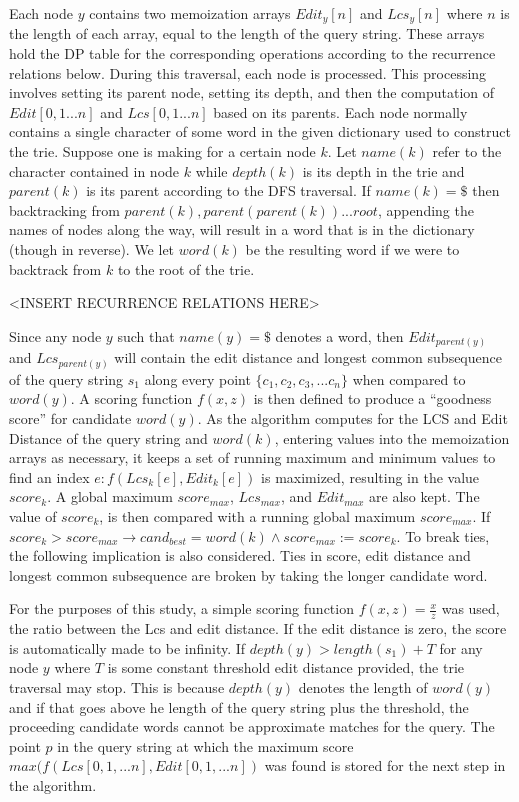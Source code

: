 \documentclass{acm_proc_article-sp}
\begin{document}
Each node $y$ contains two memoization arrays $Edit_{y}[n]$ and $Lcs_{y}[n]$ where $n$ is the length of each array, equal to the length of the query string. These arrays hold the DP table for the corresponding operations according to the recurrence relations below. During this traversal, each node is processed. This processing involves setting its parent node, setting its depth, and then the computation of $Edit[0,1. . . n]$ and $Lcs[0,1. . . n]$ based on its parents. Each node normally contains a single character of some word in the given dictionary used to construct the trie. Suppose one is making for a certain node $k$. Let $name(k)$ refer to the character contained in node $k$ while $depth(k)$ is its depth in the trie and $parent(k)$ is its parent according to the DFS traversal. If $name(k) = \$$ then backtracking from $parent(k), parent(parent(k)) . . . root$, appending the names of nodes along the way, will result in a word that is in the dictionary (though in reverse). We let $word(k)$ be the resulting word if we were to backtrack from $k$ to the root of the trie. 

<INSERT RECURRENCE RELATIONS HERE> 

Since any node $y$ such that $name(y) = \$$ denotes a word, then $Edit_{parent(y)}$ and $Lcs_{parent(y)}$ will contain the edit distance and longest common subsequence of the query string $s_1$ along every point $\{c_1,c_2,c_3, . . . c_n\}$ when compared to $word(y)$. A scoring function $f(x,z)$ is then defined to produce a ``goodness score'' for candidate $word(y)$. As the algorithm computes for the LCS and Edit Distance of the query string and $word(k)$, entering values into the memoization arrays as necessary, it keeps a set of running maximum and minimum values to find an index $e:f(Lcs_k[e],Edit_k[e])$ is maximized, resulting in the value $score_k$. A global maximum $score_{max}$, $Lcs_{max}$, and $Edit_{max}$ are also kept. The value of $score_k$, is then compared with a running global maximum $score_{max}$. If $score_k > score_{max} \rightarrow cand_{best} = word(k) \wedge score_{max} := score_k$. To break ties, the following implication is also considered. Ties in score, edit distance and longest common subsequence are broken by taking the longer candidate word. 

For the purposes of this study, a simple scoring function $f(x,z) = \frac{x}{z}$ was used, the ratio between the Lcs and edit distance. If the edit distance is zero, the score is automatically made to be infinity. If $depth(y) > length(s_1) + T$ for any node $y$ where $T$ is some constant threshold edit distance provided, the trie traversal may stop. This is because $depth(y)$ denotes the length of $word(y)$ and if that goes above he length of the query string plus the threshold, the proceeding candidate words cannot be approximate matches for the query. The point $p$ in the query string at which the maximum score $max( f(Lcs[0,1,...n],Edit[0,1,...n])$ was found is stored for the next step in the algorithm. 
\end{document}
